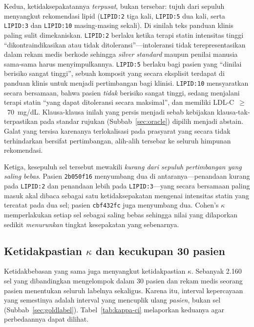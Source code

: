 Kedua, ketidaksepakatannya \emph{terpusat}, bukan tersebar: tujuh dari sepuluh menyangkut
rekomendasi lipid (\texttt{LIPID:2} tiga kali, \texttt{LIPID:5} dua kali, serta
\texttt{LIPID:3} dan \texttt{LIPID:10} masing-masing sekali). Di sinilah teks panduan klinis paling
sulit dimekaniskan. \texttt{LIPID:2} berlaku ketika terapi statin intensitas tinggi
``dikontraindikasikan atau tidak ditoleransi''---intoleransi tidak terepresentasikan dalam
rekam medis berkode sehingga \emph{silver standard} maupun penilai manusia sama-sama harus
menyimpulkannya. \texttt{LIPID:5} berlaku bagi pasien yang ``dinilai berisiko sangat tinggi'',
sebuah komposit yang secara eksplisit terdapat di panduan klinis untuk menjadi pertimbangan bagi klinisi.
\texttt{LIPID:10} mensyaratkan secara bersamaan, bahwa pasien \emph{tidak} berisiko sangat
tinggi, sedang menjalani terapi statin ``yang dapat ditoleransi secara maksimal'', dan memiliki
LDL-C~$\geq$~70~mg/dL. Klausa-klausa inilah yang persis menjadi sebab kebijakan
klausa-tak-terpastikan pada standar rujukan (Subbab~\ref{sec:oracle}) dipilih menjadi abstain. Galat
yang tersisa karenanya terlokalisasi pada prasyarat yang secara tidak terhindarkan bersifat
pertimbangan, alih-alih tersebar ke seluruh himpunan rekomendasi.

Ketiga, kesepuluh sel tersebut mewakili \emph{kurang dari sepuluh pertimbangan yang saling
bebas}. Pasien \texttt{2b050f16} menyumbang dua di antaranya---penandaan kurang pada
\texttt{LIPID:2} dan penandaan lebih pada \texttt{LIPID:3}---yang secara bersamaan paling masuk
akal dibaca sebagai satu ketidaksepakatan mengenai intensitas statin yang tercatat pada dua
sel; pasien \texttt{cbf432fc} juga menyumbang dua. Cohen's $\kappa$ memperlakukan setiap sel
sebagai saling bebas sehingga nilai yang dilaporkan sedikit \emph{menurunkan} tingkat
kesepakatan yang sebenarnya.

\subsection{Ketidakpastian $\kappa$ dan kecukupan 30 pasien}
\label{sec:kappa-ci}
Ketidakbebasan yang sama juga menyangkut ketidakpastian $\kappa$. Sebanyak 2.160 sel yang
dibandingkan mengelompok dalam 30 pasien dan rekam medis seorang pasien menentukan seluruh
labelnya sekaligus. Karena itu, interval kepercayaan yang semestinya adalah interval yang
mencuplik ulang \emph{pasien}, bukan sel (Subbab~\ref{sec:goldlabel}).
Tabel~\ref{tab:kappa-ci} melaporkan keduanya agar perbedaannya dapat dilihat.

